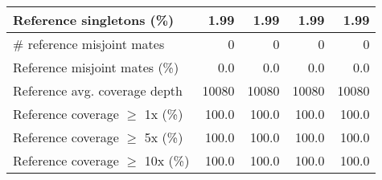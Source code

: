 \documentclass[12pt,a4paper]{article}
\begin{document}
\begin{table}[ht]
\begin{center}
\begin{tabular}{|l*{4}{|r}|}
Reference singletons (\%) & 1.99 & 1.99 & 1.99 & 1.99 \\ \hline
\# reference misjoint mates & 0 & 0 & 0 & 0 \\ \hline
Reference misjoint mates (\%) & 0.0 & 0.0 & 0.0 & 0.0 \\ \hline
Reference avg. coverage depth & 10080 & 10080 & 10080 & 10080 \\ \hline
Reference coverage $\geq$ 1x (\%) & 100.0 & 100.0 & 100.0 & 100.0 \\ \hline
Reference coverage $\geq$ 5x (\%) & 100.0 & 100.0 & 100.0 & 100.0 \\ \hline
Reference coverage $\geq$ 10x (\%) & 100.0 & 100.0 & 100.0 & 100.0 \\ \hline
\end{tabular}
\end{center}
\end{table}
\end{document}
